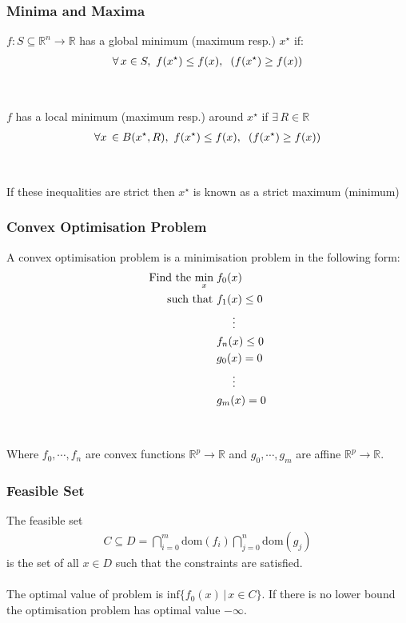 \documentclass{beamer}
\def\rnum{\mathbb{R}}
\begin{document}
\begin{frame}
    \frametitle{Minima and Maxima}
    $f: S \subseteq \rnum^{n} \rightarrow \rnum$ has a global minimum (maximum
    resp.) $x^{\star}$ if:
    \begin{align*}
        \forall \, x \in S, \, \, f(x^{\star}) \leq f(x), \hspace{2mm}  (f(x^{\star}) \geq f(x))
    \end{align*}
    \\~\\
    $f$ has a local minimum (maximum resp.) around $x^{\star}$ if $\exists \, R \in
     \rnum$ 
    \begin{align*}
        \forall x \, \in B(x^{\star}, R), \, \, f(x^{\star}) \leq f(x),
        \hspace{2mm} (f(x^{\star}) \geq f(x))
    \end{align*}
    \\~\\
    If these inequalities are strict then $x^{\star}$ is known as a strict
    maximum (minimum)
\end{frame}

\begin{frame}
    \frametitle{Convex Optimisation Problem}
    A convex optimisation problem is a minimisation problem in the following
    form:
    {\footnotesize
    \begin{align*}
        \text{Find the }\underset{x}{\text{min}}\; &f_{0}(x) \\
        \text{  such that }&f_{1}(x) \leq 0 \\
        & \hspace{5mm} \vdots \\
        &f_{n}(x) \leq 0 \\
        &g_{0}(x) = 0 \\
        &\hspace{5mm} \vdots \\
        &g_{m}(x) = 0
    \end{align*}}
    \\~\\
    Where $f_0,\cdots, f_n$ are convex functions $\rnum^{p} \rightarrow \rnum$ and $g_0, \cdots, g_m$ are
    affine $\rnum^{p} \rightarrow \rnum$.
\end{frame}

\begin{frame}
    \frametitle{Feasible Set}
    The feasible set
    \begin{align*}
    C \subseteq D =
    \bigcap\limits_{i=0}^{m}\text{dom}(f_{i})\bigcap\limits_{j=0}^{n}\text{dom}(g_{j})
    \end{align*}
    is the set of all $x \in D$ such that the constraints are satisfied.
    \\~\\
    The optimal value of problem is $\text{inf} \{f_{0}(x) \, | \, x
    \in C \}$. If there is no lower bound the optimisation problem has optimal
    value $-\infty$.
\end{frame}
\end{document}
